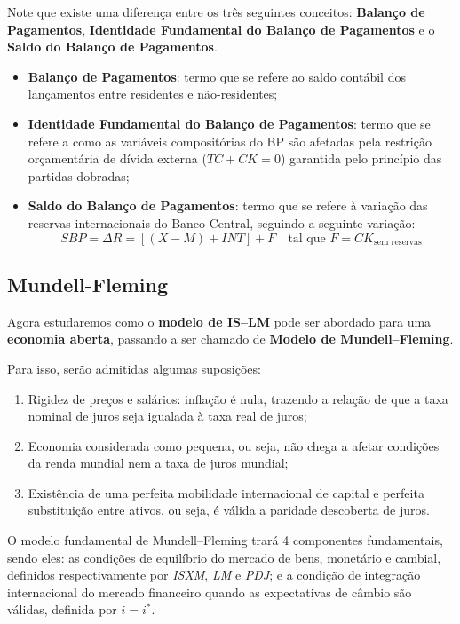 \documentclass[a4paper,12pt]{article}[abntex2]
\begin{document}
Note que existe uma diferença entre os três seguintes conceitos: \textbf{Balanço de Pagamentos}, \textbf{Identidade Fundamental do Balanço de Pagamentos} e o \textbf{Saldo do Balanço de Pagamentos}.
\begin{itemize}
  \item \textbf{Balanço de Pagamentos}: termo que se refere ao saldo contábil dos lançamentos entre residentes e não-residentes;
  \item \textbf{Identidade Fundamental do Balanço de Pagamentos}: termo que se refere a como as variáveis compositórias do BP são afetadas pela restrição orçamentária de dívida externa \bigl(\(TC+CK=0\)) garantida pelo princípio das partidas dobradas;
  \item \textbf{Saldo do Balanço de Pagamentos}: termo que se refere à variação das reservas internacionais do Banco Central, seguindo a seguinte variação:
        \[
        SBP=\Delta R=[(X-M)+INT]+F
        \quad\text{tal que }F=CK_{\text{sem reservas}}
        \]
\end{itemize}

\subsection{\textbf{Mundell-Fleming}}

Agora estudaremos como o \textbf{modelo de IS--LM} pode ser abordado para uma \textbf{economia aberta}, passando a ser chamado de \textbf{Modelo de Mundell--Fleming}.

Para isso, serão admitidas algumas suposições:

\begin{enumerate}
  \item Rigidez de preços e salários: inflação é nula, trazendo a relação de que a taxa nominal de juros seja igualada à taxa real de juros;
  \item Economia considerada como pequena, ou seja, não chega a afetar condições da renda mundial nem a taxa de juros mundial;
  \item Existência de uma perfeita mobilidade internacional de capital e perfeita substituição entre ativos, ou seja, é válida a paridade descoberta de juros.
\end{enumerate}

O modelo fundamental de Mundell--Fleming trará 4 componentes fundamentais, sendo eles: as condições de equilíbrio do mercado de bens, monetário e cambial, definidos respectivamente por \textit{ISXM}, \textit{LM} e \textit{PDJ}; e a condição de integração internacional do mercado financeiro quando as expectativas de câmbio são válidas, definida por $i = i^{\ast}$.
\end{document}
